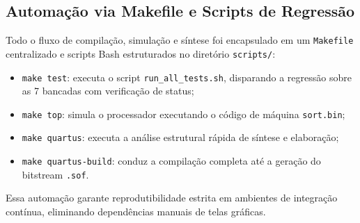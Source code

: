 \subsection{Automação via Makefile e Scripts de Regressão}
Todo o fluxo de compilação, simulação e síntese foi encapsulado em um \texttt{Makefile} centralizado e scripts Bash estruturados no diretório \texttt{scripts/}:
\begin{itemize}
    \item \texttt{make test}: executa o script \texttt{run\_all\_tests.sh}, disparando a regressão sobre as 7 bancadas com verificação de status;
    \item \texttt{make top}: simula o processador executando o código de máquina \texttt{sort.bin};
    \item \texttt{make quartus}: executa a análise estrutural rápida de síntese e elaboração;
    \item \texttt{make quartus-build}: conduz a compilação completa até a geração do bitstream \texttt{.sof}.
\end{itemize}
Essa automação garante reprodutibilidade estrita em ambientes de integração contínua, eliminando dependências manuais de telas gráficas.
